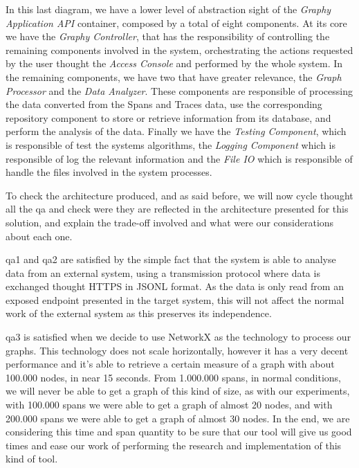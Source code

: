 In this last diagram, we have a lower level of abstraction sight of the \textit{Graphy Application API} container, composed by a total of eight components. At its core we have the \textit{Graphy Controller}, that has the responsibility of controlling the remaining components involved in the system, orchestrating the actions requested by the user thought the \textit{Access Console} and performed by the whole system. In the remaining components, we have two that have greater relevance, the \textit{Graph Processor} and the \textit{Data Analyzer}. These components are responsible of processing the data converted from the Spans and Traces data, use the corresponding repository component to store or retrieve information from its database, and perform the analysis of the data. Finally we have the \textit{Testing Component}, which is responsible of test the systems algorithms, the \textit{Logging Component} which is responsible of log the relevant information and the \textit{File IO} which is responsible of handle the files involved in the system processes.

To check the architecture produced, and as said before, we will now cycle thought all the \gls{qa} and check were they are reflected in the architecture presented for this solution, and explain the trade-off involved and what were our considerations about each one.

\gls{qa}1 and \gls{qa}2 are satisfied by the simple fact that the system is able to analyse data from an external system, using a transmission protocol where data is exchanged thought HTTPS in JSONL format. As the data is only read from an exposed endpoint presented in the target system, this will not affect the normal work of the external system as this preserves its independence.

\gls{qa}3 is satisfied when we decide to use NetworkX as the technology to process our graphs. This technology does not scale horizontally, however it has a very decent performance and it's able to retrieve a certain measure of a graph with about 100.000 nodes, in near 15 seconds\cite{networkx_speed}. From 1.000.000 spans, in normal conditions, we will never be able to get a graph of this kind of size, as with our experiments, with 100.000 spans we were able to get a graph of almost 20 nodes, and with 200.000 spans we were able to get a graph of almost 30 nodes. In the end, we are considering this time and span quantity to be sure that our tool will give us good times and ease our work of performing the research and implementation of this kind of tool.

